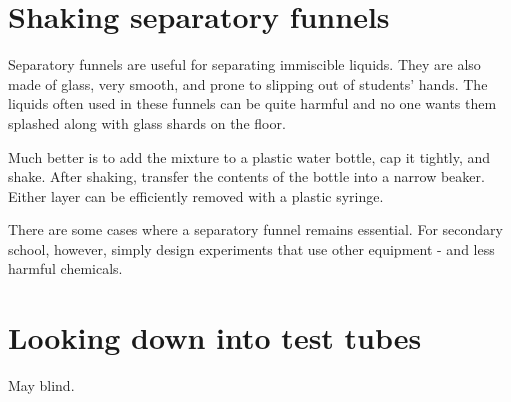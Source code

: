 \section{Shaking separatory funnels}

Separatory funnels are useful for separating immiscible liquids. 
They are also made of glass, 
very smooth, 
and prone to slipping out of students' hands. 
The liquids often used in these funnels 
can be quite harmful and no one wants them 
splashed along with glass shards on the floor.

Much better is to add the mixture to a plastic water bottle, 
cap it tightly, 
and shake. 
After shaking, 
transfer the contents of the bottle into a narrow beaker. 
Either layer can be efficiently removed with a plastic syringe.

There are some cases where a separatory funnel remains essential. 
For secondary school, 
however, 
simply design experiments that use other equipment - 
and less harmful chemicals.

\section{Looking down into test tubes}
May blind.
